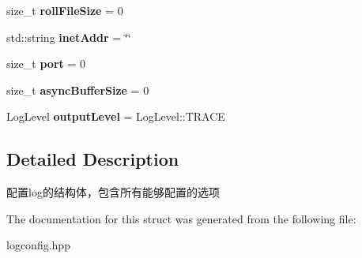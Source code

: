 \begin{DoxyCompactItemize}
\mbox{\label{structDAQ_1_1LogConfigStruct_a45036984ce51dbec66c59497334a3be8}} 
size\+\_\+t {\bfseries roll\+File\+Size} = 0
\item 
\mbox{\label{structDAQ_1_1LogConfigStruct_adbfa025b221fe9205cd36c8ac002e669}} 
std\+::string {\bfseries inet\+Addr} = \char`\"{}\char`\"{}
\item 
\mbox{\label{structDAQ_1_1LogConfigStruct_ac8935a41b49fb8a8da7606f72be3a92e}} 
size\+\_\+t {\bfseries port} = 0
\item 
\mbox{\label{structDAQ_1_1LogConfigStruct_a6f0d98a5177d83c772660b9ff59664dc}} 
size\+\_\+t {\bfseries async\+Buffer\+Size} = 0
\item 
\mbox{\label{structDAQ_1_1LogConfigStruct_a189608eb7aa49e23610635bfb0ae16c4}} 
Log\+Level {\bfseries output\+Level} = Log\+Level\+::\+T\+R\+A\+CE
\end{DoxyCompactItemize}


\subsection{Detailed Description}
配置log的结构体，包含所有能够配置的选项 

The documentation for this struct was generated from the following file\+:\begin{DoxyCompactItemize}
\item 
logconfig.\+hpp\end{DoxyCompactItemize}
